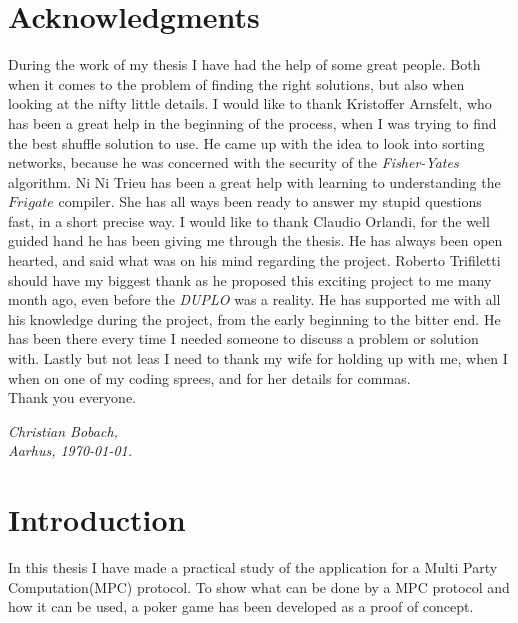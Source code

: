 \documentclass[twoside,11pt,openright]{report}
\newcommand{\FY}{\textit{Fisher-Yates} }
\newcommand{\DUPLO}{\textit{DUPLO} }
\begin{document}
\chapter*{Acknowledgments}
During the work of my thesis I have had the help of some great people. Both when it comes to the problem of finding the right solutions, but also when looking at the nifty little details. I would like to thank Kristoffer Arnsfelt, who has been a great help in the beginning of the process, when I was trying to find the best shuffle solution to use. He came up with the idea to look into sorting networks, because he was concerned with the security of the \FY algorithm. Ni Ni Trieu has been a great help with learning to understanding the $Frigate$ compiler. She has all ways been ready to answer my stupid questions fast, in a short precise way. I would like to thank Claudio Orlandi, for the well guided hand he has been giving me through the thesis. He has always been open hearted, and said what was on his mind regarding the project. Roberto Trifiletti should have my biggest thank as he proposed this exciting project to me many month ago, even before the \DUPLO was a reality. He has supported me with all his knowledge during the project, from the early beginning to the bitter end. He has been there every time I needed someone to discuss a problem or solution with. Lastly but not leas I need to thank my wife for holding up with me, when I when on one of my coding sprees, and for her details for commas.\\
Thank you everyone.

\vspace{2ex}
\begin{flushright}
  \emph{Christian Bobach,}\\
  \emph{Aarhus, \today.}
\end{flushright}

\tableofcontents
{}
\setcounter{secnumdepth}{2}

\chapter{Introduction}
\label{ch:intro}
In this thesis I have made a practical study of the application for a Multi Party Computation(MPC) protocol. To show what can be done by a MPC protocol and how it can be used, a poker game has been developed as a proof of concept.
\end{document}
